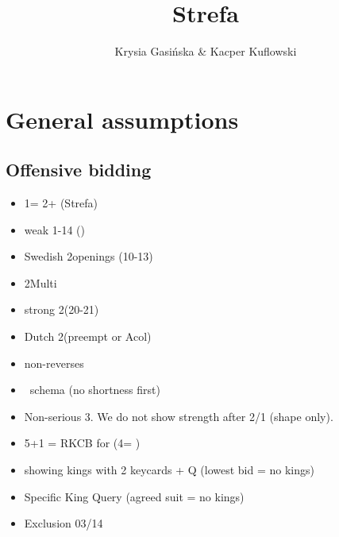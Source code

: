 \documentclass[12pt, a4paper]{report}
\title{\spades\clubs Strefa \xdiams\xhearts}
\author{Krysia Gasińska \& Kacper Kuflowski}
\begin{document}
\maketitle

\tableofcontents

\chapter*{\colorbox{Plum!30}{General assumptions}}
 {

        
    \section*{\colorbox{blue!30}{Offensive bidding}}
        \begin{itemize}
            \item 1\clubs = 2+ (Strefa)
            \item weak 1-14 ()
            \item Swedish 2\major openings (10-13)
            \item 2\diams Multi
            \item strong 2\nt (20-21)
            \item Dutch 2\clubs (\diams preempt or Acol)
            \item non-\gf reverses
            \item \hsf\ schema (no shortness first)
            \item Non-serious 3\nt. We do not show strength after 2/1 (shape only).
            \item 5\minor+1 = RKCB for \minor (4\nt = \nat)
            \item showing kings with 2 keycards + Q (lowest bid = no kings)
            \item Specific King Query (agreed suit = no kings)
            \item Exclusion 03/14
        \end{itemize}

}
\end{document}
